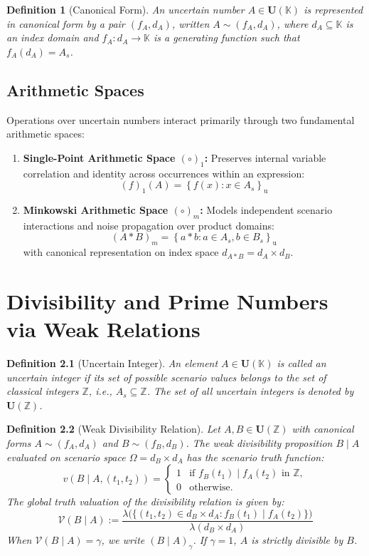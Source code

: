 \documentclass[a4paper,14pt, twoside]{memoir}
\newtheorem{definition}{Definition}[chapter]
\newcommand{\set}[1]{\left\{#1\right\}} %
\newcommand{\s}[1]{\set{#1}_\mathrm{u}} %
\newcommand{\tsbd}[1]{\mathbf{U}(\mathbb{#1})}
\newcommand{\ddclmd}{\mathcal{V}} %
\newcommand{\kgdd}[1]{\left(#1\right)_1} %
\begin{document}
	\begin{definition}[Canonical Form]
		An uncertain number $A \in \tsbd{K}$ is represented in canonical form by a pair $(f_A, d_A)$, written $A \sim (f_A, d_A)$, where $d_A \subseteq \mathbb{K}$ is an index domain and $f_A : d_A \to \mathbb{K}$ is a generating function such that $f_A(d_A) = A_s$.
	\end{definition}
	
	\section{Arithmetic Spaces}
	Operations over uncertain numbers interact primarily through two fundamental arithmetic spaces:
	\begin{enumerate}[leftmargin=*]
		\item \textbf{Single-Point Arithmetic Space $(\circ)_1$:} Preserves internal variable correlation and identity across occurrences within an expression:
		\[
		\kgdd{f}(A) = \s{f(x) : x \in A_s}
		\]
		\item \textbf{Minkowski Arithmetic Space $(\circ)_m$:} Models independent scenario interactions and noise propagation over product domains:
		\[
		(A * B)_m = \s{a * b : a \in A_s, b \in B_s}
		\]
		with canonical representation on index space $d_{A * B} = d_A \times d_B$.
	\end{enumerate}
	
	\chapter{Divisibility and Prime Numbers via Weak Relations}
	
	\begin{definition}[Uncertain Integer]
		An element $A \in \tsbd{K}$ is called an uncertain integer if its set of possible scenario values belongs to the set of classical integers $\mathbb{Z}$, i.e., $A_s \subseteq \mathbb{Z}$. The set of all uncertain integers is denoted by $\tsbd{Z}$.
	\end{definition}
	
	\begin{definition}[Weak Divisibility Relation]
		Let $A, B \in \tsbd{Z}$ with canonical forms $A \sim (f_A, d_A)$ and $B \sim (f_B, d_B)$. The weak divisibility proposition $B \mid A$ evaluated on scenario space $\Omega = d_B \times d_A$ has the scenario truth function:
		\[
		v(B \mid A, (t_1, t_2)) = \begin{cases}
			1 & \text{if } f_B(t_1) \mid f_A(t_2) \text{ in } \mathbb{Z}, \\
			0 & \text{otherwise.}
		\end{cases}
		\]
		The global truth valuation of the divisibility relation is given by:
		\[
		\ddclmd(B \mid A) := \frac{\lambda\big(\{(t_1, t_2) \in d_B \times d_A : f_B(t_1) \mid f_A(t_2)\}\big)}{\lambda(d_B \times d_A)}
		\]
		When $\ddclmd(B \mid A) = \gamma$, we write $(B \mid A)_\gamma$. If $\gamma = 1$, $A$ is strictly divisible by $B$.
	\end{definition}
	
\end{document}
